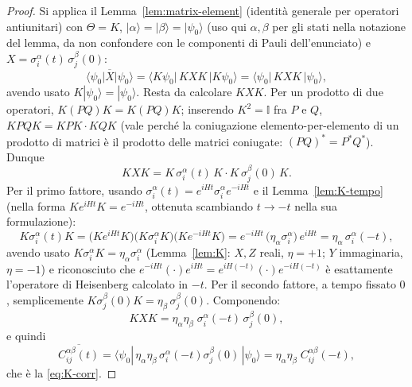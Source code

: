 \documentclass[11pt,a4paper]{article}
\begin{document}
\begin{proof}
Si applica il Lemma~\ref{lem:matrix-element} (identità generale per operatori antiunitari) con
$\Theta=K$, $|\alpha\rangle=|\beta\rangle=|\psi_0\rangle$ (uso qui $\alpha,\beta$ per gli stati
nella notazione del lemma, da non confondere con le componenti di Pauli dell'enunciato) e
$X=\sigma_i^\alpha(t)\,\sigma_j^\beta(0)$:
\begin{equation}
\overline{\langle\psi_0|X|\psi_0\rangle} = \langle K\psi_0|\,KXK\,|K\psi_0\rangle
= \langle\psi_0|\,KXK\,|\psi_0\rangle,
\end{equation}
avendo usato $K|\psi_0\rangle=|\psi_0\rangle$. Resta da calcolare $KXK$. Per un prodotto di due
operatori, $K(PQ)K = K(PQ)K$; inserendo $K^2=\mathbb I$ fra $P$ e $Q$, $KPQK=KPK\cdot KQK$
(vale perché la coniugazione elemento-per-elemento di un prodotto di matrici è il prodotto delle
matrici coniugate: $(PQ)^*=P^*Q^*$). Dunque
\begin{equation}
KXK = K\,\sigma_i^\alpha(t)\,K \cdot K\,\sigma_j^\beta(0)\,K.
\end{equation}
Per il primo fattore, usando $\sigma_i^\alpha(t)=e^{iHt}\sigma_i^\alpha e^{-iHt}$ e il
Lemma~\ref{lem:K-tempo} (nella forma $Ke^{iHt}K=e^{-iHt}$, ottenuta scambiando $t\to-t$ nella
sua formulazione):
\begin{equation}
K\sigma_i^\alpha(t)K = \big(Ke^{iHt}K\big)\big(K\sigma_i^\alpha K\big)\big(Ke^{-iHt}K\big)
= e^{-iHt}\,\big(\eta_\alpha\sigma_i^\alpha\big)\,e^{iHt}
= \eta_\alpha\,\sigma_i^\alpha(-t),
\end{equation}
avendo usato $K\sigma_i^\alpha K=\eta_\alpha\sigma_i^\alpha$ (Lemma~\ref{lem:K}: $X,Z$ reali,
$\eta=+1$; $Y$ immaginaria, $\eta=-1$) e riconosciuto che
$e^{-iHt}(\cdot)e^{iHt}=e^{iH(-t)}(\cdot)e^{-iH(-t)}$ è esattamente l'operatore di Heisenberg
calcolato in $-t$. Per il secondo fattore, a tempo fissato $0$, semplicemente
$K\sigma_j^\beta(0)K = \eta_\beta\,\sigma_j^\beta(0)$. Componendo:
\begin{equation}
KXK = \eta_\alpha\eta_\beta\;\sigma_i^\alpha(-t)\,\sigma_j^\beta(0),
\end{equation}
e quindi
\begin{equation}
\overline{C_{ij}^{\alpha\beta}(t)} = \langle\psi_0|\,\eta_\alpha\eta_\beta\,\sigma_i^\alpha(-t)\sigma_j^\beta(0)\,|\psi_0\rangle
= \eta_\alpha\eta_\beta\;C_{ij}^{\alpha\beta}(-t),
\end{equation}
che è la \eqref{eq:K-corr}.
\end{proof}
\end{document}
